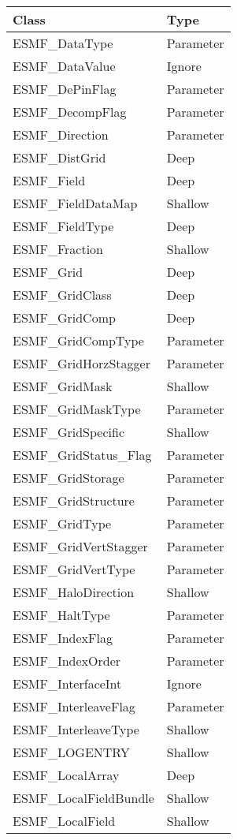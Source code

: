 \begin{table}[t]
\begin{tabular}{ll}

{\bf Class} & {\bf Type} \\ \hline

ESMF\_DataType              & Parameter \\
ESMF\_DataValue             & Ignore\\
ESMF\_DePinFlag             & Parameter \\
ESMF\_DecompFlag            & Parameter \\
ESMF\_Direction             & Parameter \\
ESMF\_DistGrid              & Deep \\
ESMF\_Field                 & Deep \\
ESMF\_FieldDataMap          & Shallow\\
ESMF\_FieldType             & Deep \\
ESMF\_Fraction              & Shallow\\
ESMF\_Grid                  & Deep \\
ESMF\_GridClass             & Deep \\
ESMF\_GridComp              & Deep \\
ESMF\_GridCompType          & Parameter \\
ESMF\_GridHorzStagger       & Parameter \\
ESMF\_GridMask              & Shallow\\
ESMF\_GridMaskType          & Parameter \\
ESMF\_GridSpecific          & Shallow\\
ESMF\_GridStatus\_Flag            & Parameter \\
ESMF\_GridStorage           & Parameter \\
ESMF\_GridStructure         & Parameter \\
ESMF\_GridType              & Parameter \\
ESMF\_GridVertStagger       & Parameter \\
ESMF\_GridVertType          & Parameter \\
ESMF\_HaloDirection         & Shallow\\
ESMF\_HaltType              & Parameter \\
ESMF\_IndexFlag             & Parameter \\
ESMF\_IndexOrder            & Parameter \\
ESMF\_InterfaceInt          & Ignore\\
ESMF\_InterleaveFlag        & Parameter \\
ESMF\_InterleaveType        & Shallow\\
ESMF\_LOGENTRY              & Shallow\\
ESMF\_LocalArray            & Deep \\
ESMF\_LocalFieldBundle           & Shallow\\
ESMF\_LocalField            & Shallow\\

\end{tabular}
\end{table}

